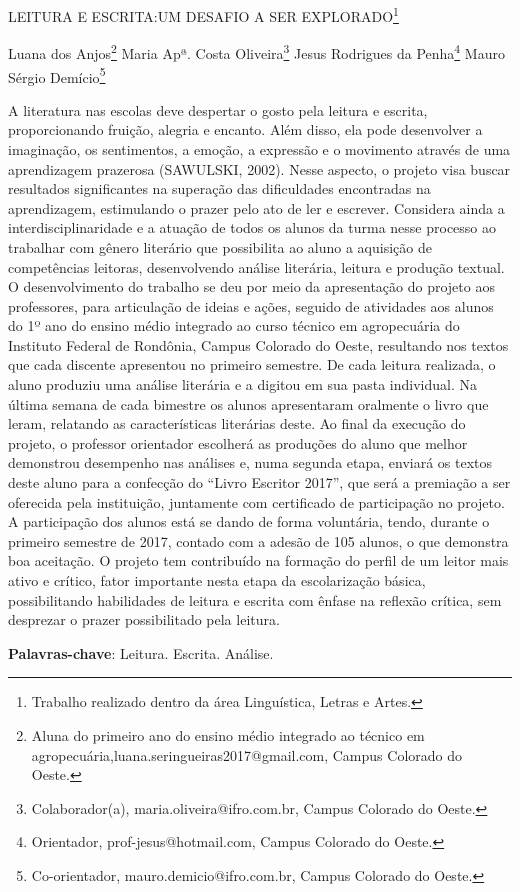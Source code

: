 \documentclass[article,12pt,onesidea,4paper,english,brazil]{abntex2}
\begin{document}
	
	
	\frenchspacing 
	
	\begin{center}
		\LARGE LEITURA E ESCRITA:UM DESAFIO A SER EXPLORADO\footnote{Trabalho realizado dentro da área Linguística, Letras e Artes.}
		
		\normalsize
	Luana dos Anjos\footnote{Aluna do primeiro ano do ensino médio integrado ao técnico em agropecuária,luana.seringueiras2017@gmail.com, Campus Colorado do Oeste.} 
	Maria Apª. Costa Oliveira\footnote{Colaborador(a), maria.oliveira@ifro.com.br, Campus Colorado do Oeste.} 
	Jesus Rodrigues da Penha\footnote{Orientador, prof-jesus@hotmail.com, Campus Colorado do Oeste.} 
	Mauro Sérgio Demício\footnote{Co-orientador, mauro.demicio@ifro.com.br, Campus Colorado do Oeste.} 
	\end{center}
	
	\noindent A literatura nas escolas deve despertar o gosto pela leitura e escrita, proporcionando
	fruição, alegria e encanto. Além disso, ela pode desenvolver a imaginação, os
	sentimentos, a emoção, a expressão e o movimento através de uma aprendizagem
	prazerosa (SAWULSKI, 2002). Nesse aspecto, o projeto visa buscar resultados
	significantes na superação das dificuldades encontradas na aprendizagem,
	estimulando o prazer pelo ato de ler e escrever. Considera ainda a
	interdisciplinaridade e a atuação de todos os alunos da turma nesse processo ao
	trabalhar com gênero literário que possibilita ao aluno a aquisição de competências
	leitoras, desenvolvendo análise literária, leitura e produção textual. O
	desenvolvimento do trabalho se deu por meio da apresentação do projeto aos
	professores, para articulação de ideias e ações, seguido de atividades aos alunos do
	1º ano do ensino médio integrado ao curso técnico em agropecuária do Instituto
	Federal de Rondônia, Campus Colorado do Oeste, resultando nos textos que cada
	discente apresentou no primeiro semestre. De cada leitura realizada, o aluno
	produziu uma análise literária e a digitou em sua pasta individual. Na última semana
	de cada bimestre os alunos apresentaram oralmente o livro que leram, relatando as
	características literárias deste. Ao final da execução do projeto, o professor
	orientador escolherá as produções do aluno que melhor demonstrou desempenho
	nas análises e, numa segunda etapa, enviará os textos deste aluno para a
	confecção do “Livro Escritor 2017”, que será a premiação a ser oferecida pela
	instituição, juntamente com certificado de participação no projeto. A participação dos
	alunos está se dando de forma voluntária, tendo, durante o primeiro semestre de
	2017, contado com a adesão de 105 alunos, o que demonstra boa aceitação. O
	projeto tem contribuído na formação do perfil de um leitor mais ativo e crítico, fator
	importante nesta etapa da escolarização básica, possibilitando habilidades de leitura
	e escrita com ênfase na reflexão crítica, sem desprezar o prazer possibilitado pela
	leitura.
	
	\vspace{\onelineskip}
	
	\noindent
	\textbf{Palavras-chave}: Leitura. Escrita. Análise.
	
\end{document}
